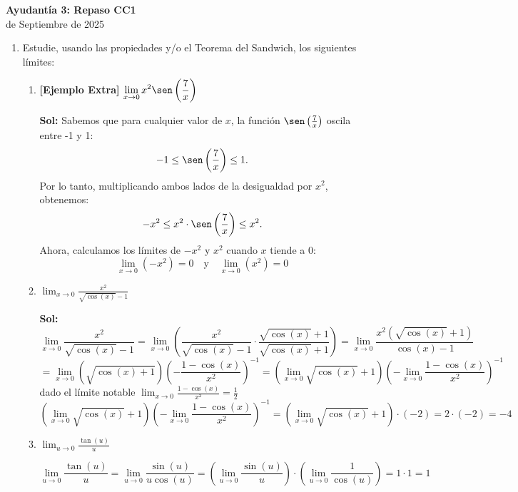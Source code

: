 \documentclass[letterpaper,12pt]{article}
\theoremstyle{plain}
\theoremstyle{definition}
\newcommand{\1}{\mathbbm{1}}
\begin{document}
\vspace{-0.2cm}
\begin{center}
\LARGE\textbf{Ayudantía 3: Repaso CC1}\\
\large {\fontsize{13}{14} de Septiembre de 2025}
\end{center}
\vspace{-0.2cm}
\begin{enumerate}[label=\textbf{P\arabic*.}, itemsep=0cm]
\item Estudie, usando las propiedades y/o el Teorema del Sandwich, los siguientes límites:

\begin{enumerate}
    \item[a)] \textbf{[Ejemplo Extra]} \( \displaystyle \lim_{x \to 0} x^2 \sen\left(\frac{7}{x}\right) \)

    \color{blue}
    \textbf{Sol:} 
Sabemos que para cualquier valor de \( x \), la función \( \sen\left( \frac{7}{x} \right) \) oscila entre -1 y 1:
\[
-1 \leq \sen\left( \frac{7}{x} \right) \leq 1.
\]
Por lo tanto, multiplicando ambos lados de la desigualdad por \( x^2 \), obtenemos:
\[
- x^2 \leq x^2 \cdot \sen\left( \frac{7}{x} \right) \leq x^2.
\]
Ahora, calculamos los límites de \( -x^2 \) y \( x^2 \) cuando \( x \) tiende a 0:
\[
\lim_{x \to 0} (-x^2) = 0 \quad \text{y} \quad 
\lim_{x \to 0} (x^2) = 0
\]
    \color{black}
    
    \item $\displaystyle \lim_{x \to 0} \frac{x^2}{\sqrt{\cos(x)} - 1}$

\vspace{0.2cm}
\color{blue}
\textbf{Sol:}
\[
\lim_{x \to 0} \frac{x^2}{\sqrt{\cos(x)} - 1}
= \lim_{x \to 0} \left( \frac{x^2}{\sqrt{\cos(x)} - 1} \cdot \frac{\sqrt{\cos(x)} + 1}{\sqrt{\cos(x)} + 1} \right)
= \lim_{x \to 0} \frac{x^2(\sqrt{\cos(x)} + 1)}{\cos(x) - 1}
\]
\[
= \lim_{x \to 0} \left(\sqrt{\cos(x)+1}  \right)\left(-\frac{1-\cos(x)}{x^2}\right)^{-1} 
= \left(\lim_{x \to 0}\sqrt{\cos(x)} + 1 \right)\left(-\lim_{x \to 0} \frac{1-\cos(x)}{x^2}\right)^{-1} 
\]
dado el límite notable $\displaystyle \lim_{x \to 0} \frac{1-\cos(x)}{x^2}=\frac{1}{2}$
\[
\left(\lim_{x \to 0}\sqrt{\cos(x)} + 1 \right)\left(-\lim_{x \to 0} \frac{1-\cos(x)}{x^2}\right)^{-1} = \left(\lim_{x \to 0}\sqrt{\cos(x)} +1 \right) \cdot (-2) = 2 \cdot (-2) =-4
\]
\color{black}
    \item $\displaystyle \lim_{u \to 0} \frac{\tan(u)}{u}$
    
\vspace{0.2cm}
\color{blue}
\[
\lim_{u \to 0} \frac{\tan(u)}{u} = \lim_{u \to 0} \frac{\sin(u)}{u \cos(u)} = \left( \lim_{u \to 0} \frac{\sin(u)}{u} \right) \cdot \left( \lim_{u \to 0} \frac{1}{\cos(u)} \right) = 1 \cdot 1 = 1
\]
\color{black}
\end{enumerate}


\end{enumerate}
\end{document}
